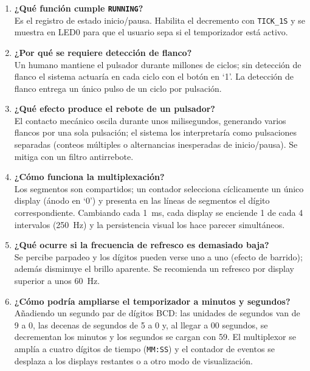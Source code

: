 \documentclass[letterpaper,12pt]{article}
\begin{document}
\begin{enumerate}
    \item \textbf{¿Qué función cumple \texttt{RUNNING}?}\\
    Es el registro de estado inicio/pausa. Habilita el decremento con \texttt{TICK\_1S} y se muestra en LED0 para que el usuario sepa si el temporizador está activo.

    \item \textbf{¿Por qué se requiere detección de flanco?}\\
    Un humano mantiene el pulsador durante millones de ciclos; sin detección de flanco el sistema actuaría en cada ciclo con el botón en `1'. La detección de flanco entrega un único pulso de un ciclo por pulsación.

    \item \textbf{¿Qué efecto produce el rebote de un pulsador?}\\
    El contacto mecánico oscila durante unos milisegundos, generando varios flancos por una sola pulsación; el sistema los interpretaría como pulsaciones separadas (conteos múltiples o alternancias inesperadas de inicio/pausa). Se mitiga con un filtro antirrebote.

    \item \textbf{¿Cómo funciona la multiplexación?}\\
    Los segmentos son compartidos; un contador selecciona cíclicamente un único display (ánodo en `0') y presenta en las líneas de segmentos el dígito correspondiente. Cambiando cada 1~ms, cada display se enciende 1 de cada 4 intervalos (250~Hz) y la persistencia visual los hace parecer simultáneos.

    \item \textbf{¿Qué ocurre si la frecuencia de refresco es demasiado baja?}\\
    Se percibe parpadeo y los dígitos pueden verse uno a uno (efecto de barrido); además disminuye el brillo aparente. Se recomienda un refresco por display superior a unos 60~Hz.

    \item \textbf{¿Cómo podría ampliarse el temporizador a minutos y segundos?}\\
    Añadiendo un segundo par de dígitos BCD: las unidades de segundos van de 9 a 0, las decenas de segundos de 5 a 0 y, al llegar a 00 segundos, se decrementan los minutos y los segundos se cargan con 59. El multiplexor se amplía a cuatro dígitos de tiempo (\texttt{MM:SS}) y el contador de eventos se desplaza a los displays restantes o a otro modo de visualización.
\end{enumerate}
\end{document}
